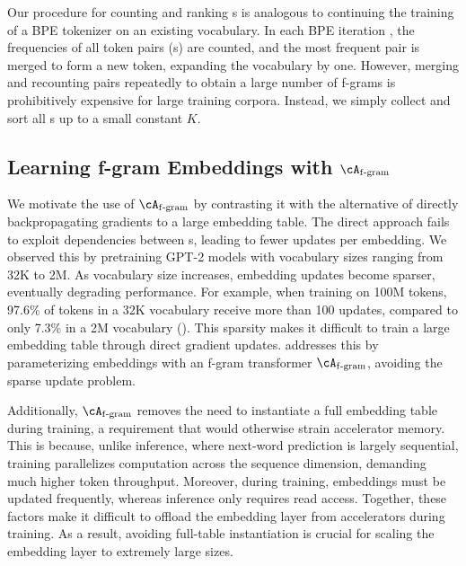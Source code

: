 Our procedure for counting and ranking s is analogous to continuing the training of a BPE tokenizer on an existing vocabulary. In each BPE iteration \citep{gage1994new,sennrich2015neural}, the frequencies of all token pairs (s) are counted, and the most frequent pair is merged to form a new token, expanding the vocabulary by one. However, merging and recounting pairs repeatedly to obtain a large number of f-grams is prohibitively expensive for large training corpora. Instead, we simply collect and sort all s up to a small constant $K$.

\subsection{\boldmath Learning f-gram Embeddings with $\Afgram$}
\label{subsec:train_embedding}

We motivate the use of $\Afgram$ by contrasting it with the alternative of directly backpropagating gradients to a large embedding table.
The direct approach fails to exploit dependencies between s, leading to fewer updates per embedding. We observed this by pretraining GPT-2 models with vocabulary sizes ranging from 32K to 2M. As vocabulary size increases, embedding updates become sparser, eventually degrading performance. For example, when training on 100M tokens, 97.6\% of tokens in a 32K vocabulary receive more than 100 updates, compared to only 7.3\% in a 2M vocabulary ().
This sparsity makes it difficult to train a large embedding table through direct gradient updates.
\SCONE addresses this by parameterizing embeddings with an f-gram transformer $\Afgram$, avoiding the sparse update problem. 

Additionally, $\Afgram$ removes the need to instantiate a full embedding table during training, a requirement that would otherwise strain accelerator memory. This is because, unlike inference, where next-word prediction is largely sequential, training parallelizes computation across the sequence dimension, demanding much higher token throughput. Moreover, during training, embeddings must be updated  frequently, whereas inference only requires read access. Together, these factors make it difficult to offload the embedding layer from accelerators during training. As a result, avoiding full-table instantiation is crucial for scaling the embedding layer to extremely large sizes.



